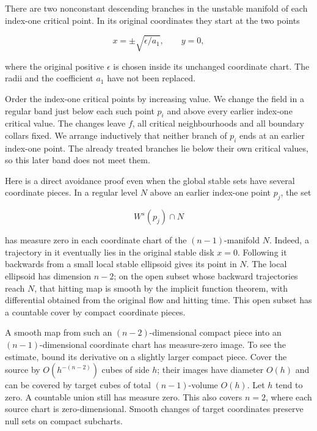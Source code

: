There are two nonconstant descending branches in the unstable manifold of each index-one critical point. In its original coordinates they start at the two points

\begin{equation}
x=\pm\sqrt{\epsilon/a_1},\qquad y=0,
 \label{courseIII:removing-the-original-zero-and-top-handles:eq:1.1}
\end{equation}

where the original positive \(\epsilon\) is chosen inside its unchanged coordinate chart. The radii and the coefficient \(a_1\) have not been replaced.

Order the index-one critical points by increasing value. We change the field in a regular band just below each such point \(p_i\) and above every earlier index-one critical value. The changes leave \(f\), all critical neighbourhoods and all boundary collars fixed. We arrange inductively that neither branch of \(p_i\) ends at an earlier index-one point. The already treated branches lie below their own critical values, so this later band does not meet them.

Here is a direct avoidance proof even when the global stable sets have several coordinate pieces. In a regular level \(N\) above an earlier index-one point \(p_j\), the set

\begin{equation}
W^s(p_j)\cap N
 \label{courseIII:removing-the-original-zero-and-top-handles:eq:1.2}
\end{equation}

has measure zero in each coordinate chart of the \((n-1)\)-manifold \(N\). Indeed, a trajectory in it eventually lies in the original stable disk \(x=0\). Following it backwards from a small local stable ellipsoid gives its point in \(N\). The local ellipsoid has dimension \(n-2\); on the open subset whose backward trajectories reach \(N\), that hitting map is smooth by the implicit function theorem, with differential obtained from the original flow and hitting time. This open subset has a countable cover by compact coordinate pieces.

A smooth map from such an \((n-2)\)-dimensional compact piece into an \((n-1)\)-dimensional coordinate chart has measure-zero image. To see the estimate, bound its derivative on a slightly larger compact piece. Cover the source by \(O(h^{-(n-2)})\) cubes of side \(h\); their images have diameter \(O(h)\) and can be covered by target cubes of total \((n-1)\)-volume \(O(h)\). Let \(h\) tend to zero. A countable union still has measure zero. This also covers \(n=2\), where each source chart is zero-dimensional. Smooth changes of target coordinates preserve null sets on compact subcharts.

